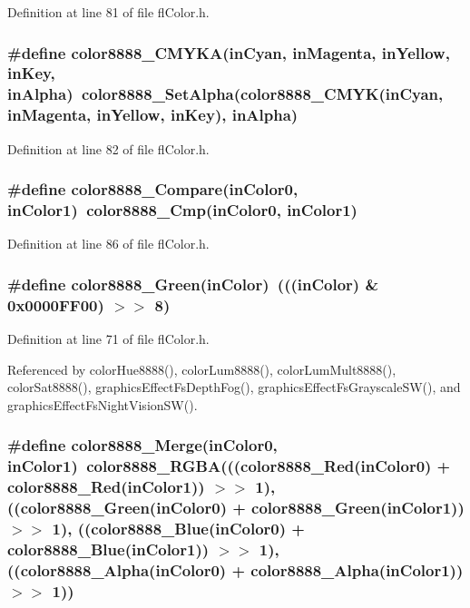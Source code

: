 Definition at line 81 of file fl\-Color.h.
\subsubsection{\setlength{\rightskip}{0pt plus 5cm}\#define color8888\_\-CMYKA(in\-Cyan, in\-Magenta, in\-Yellow, in\-Key, in\-Alpha)~color8888\_\-Set\-Alpha(color8888\_\-CMYK(in\-Cyan, in\-Magenta, in\-Yellow, in\-Key), in\-Alpha)}\label{flColor_8h_7c76393479db34cb16fd293fffb30f63}




Definition at line 82 of file fl\-Color.h.
\subsubsection{\setlength{\rightskip}{0pt plus 5cm}\#define color8888\_\-Compare(in\-Color0, in\-Color1)~color8888\_\-Cmp(in\-Color0, in\-Color1)}\label{flColor_8h_29fafabf192dffb4edf4cd3644f7331f}




Definition at line 86 of file fl\-Color.h.
\subsubsection{\setlength{\rightskip}{0pt plus 5cm}\#define color8888\_\-Green(in\-Color)~(((in\-Color) \& 0x0000FF00) $>$$>$ 8)}\label{flColor_8h_b81f6971f534c22102d89843cdd0f79c}




Definition at line 71 of file fl\-Color.h.

Referenced by color\-Hue8888(), color\-Lum8888(), color\-Lum\-Mult8888(), color\-Sat8888(), graphics\-Effect\-Fs\-Depth\-Fog(), graphics\-Effect\-Fs\-Grayscale\-SW(), and graphics\-Effect\-Fs\-Night\-Vision\-SW().
\subsubsection{\setlength{\rightskip}{0pt plus 5cm}\#define color8888\_\-Merge(in\-Color0, in\-Color1)~color8888\_\-RGBA(((color8888\_\-Red(in\-Color0) + color8888\_\-Red(in\-Color1)) $>$$>$ 1), ((color8888\_\-Green(in\-Color0) + color8888\_\-Green(in\-Color1)) $>$$>$ 1), ((color8888\_\-Blue(in\-Color0) + color8888\_\-Blue(in\-Color1)) $>$$>$ 1), ((color8888\_\-Alpha(in\-Color0) + color8888\_\-Alpha(in\-Color1)) $>$$>$ 1))}\label{flColor_8h_d96b4f70c37dc98c40ed25af0f109316}




